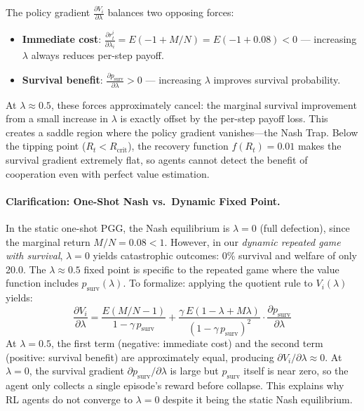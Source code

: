 \documentclass{article}
\begin{document}
The policy gradient $\frac{\partial V_i}{\partial \lambda}$ balances two opposing forces:
\begin{itemize}
    \item \textbf{Immediate cost}: $\frac{\partial r_t^i}{\partial \lambda_i} = E(-1 + M/N) = E(-1 + 0.08) < 0$ --- increasing $\lambda$ always reduces per-step payoff.
    \item \textbf{Survival benefit}: $\frac{\partial p_{\text{surv}}}{\partial \lambda} > 0$ --- increasing $\lambda$ improves survival probability.
\end{itemize}

At $\lambda \approx 0.5$, these forces approximately cancel: the marginal survival improvement from a small increase in $\lambda$ is exactly offset by the per-step payoff loss. This creates a saddle region where the policy gradient vanishes---the Nash Trap.
Below the tipping point ($R_t < R_{\text{crit}}$), the recovery function $f(R_t) = 0.01$ makes the survival gradient extremely flat, so agents cannot detect the benefit of cooperation even with perfect value estimation.

\paragraph{Clarification: One-Shot Nash vs.\ Dynamic Fixed Point.}
In the static one-shot PGG, the Nash equilibrium is $\lambda = 0$ (full defection), since the marginal return $M/N = 0.08 < 1$.
However, in our \emph{dynamic repeated game with survival}, $\lambda = 0$ yields catastrophic outcomes: 0\% survival and welfare of only 20.0.
The $\lambda \approx 0.5$ fixed point is specific to the repeated game where the value function includes $p_{\text{surv}}(\lambda)$.
To formalize: applying the quotient rule to $V_i(\lambda)$ yields:
\begin{equation}
\frac{\partial V_i}{\partial \lambda} = \frac{E(M/N - 1)}{1 - \gamma\, p_{\text{surv}}} + \frac{\gamma\, E(1 - \lambda + M\lambda)}{(1 - \gamma\, p_{\text{surv}})^2} \cdot \frac{\partial p_{\text{surv}}}{\partial \lambda}
\end{equation}
At $\lambda = 0.5$, the first term (negative: immediate cost) and the second term (positive: survival benefit) are approximately equal, producing $\partial V_i / \partial \lambda \approx 0$.
At $\lambda = 0$, the survival gradient $\partial p_{\text{surv}}/\partial \lambda$ is large but $p_{\text{surv}}$ itself is near zero, so the agent only collects a single episode's reward before collapse.
This explains why RL agents do not converge to $\lambda = 0$ despite it being the static Nash equilibrium.
\end{document}
